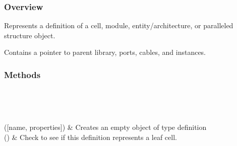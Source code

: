 \documentclass[letterpaper,10pt,english,openany,oneside]{sphinxmanual}
\begin{document}
\subsubsection{Overview}
\label{\detokenize{reference/classes/definition:overview}}

\begin{fulllineitems}
\label{\detokenize{reference/classes/definition:spydrnet.Definition}}
Represents a definition of a cell, module, entity/architecture, or paralleled structure object.

Contains a pointer to parent library, ports, cables, and instances.

\end{fulllineitems}



\subsubsection{Methods}
\label{\detokenize{reference/classes/definition:methods}}

\begin{savenotes}\sphinxatlongtablestart\begin{longtable}[c]{}
\hline

\endfirsthead

%
{}\\
\hline

\endhead

\hline
{}\\
\endfoot

\endlastfoot

{\hyperref[\detokenize{reference/classes/generated/spydrnet.Definition.__init__:spydrnet.Definition.__init__}]{}}({[}name, properties{]})
&
Creates an empty object of type definition
\\
\hline
{\hyperref[\detokenize{reference/classes/generated/spydrnet.Definition.is_leaf:spydrnet.Definition.is_leaf}]{}}()
&
Check to see if this definition represents a leaf cell.
\\
\hline
\end{longtable}\sphinxatlongtableend\end{savenotes}
\end{document}
